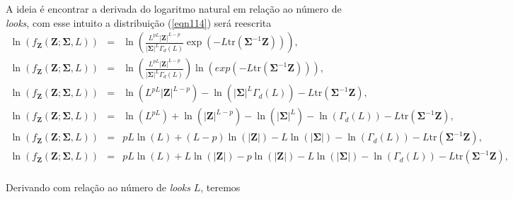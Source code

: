 A ideia é encontrar a derivada do logaritmo natural em relação ao número de {\it looks}, com esse intuito a distribuição (\ref{eqn114}) será reescrita
\begin{equation}\label{eqn115}
\begin{array}{ccc}
	\ln{\left(f_{\mathbf{Z}}(\mathbf{Z};\mathbf{\Sigma},L)\right)}&=&\ln{\left(\frac{L^{pL}|\mathbf{Z}|^{L-p}}{|\mathbf{\Sigma}|^{L}\Gamma_d(L)} \exp(-L\mathrm{tr}{(\mathbf{\Sigma}^{-1}\mathbf{Z})})\right)}, \\
	\ln{\left(f_{\mathbf{Z}}(\mathbf{Z};\mathbf{\Sigma},L)\right)}&=&\ln{\left(\frac{L^{pL}|\mathbf{Z}|^{L-p}}{|\mathbf{\Sigma}|^{L}\Gamma_d(L)}\right)}\ln{\left( exp(-L\mathrm{tr}{(\mathbf{\Sigma}^{-1}\mathbf{Z})})\right)}, \\
	\ln{\left(f_{\mathbf{Z}}(\mathbf{Z};\mathbf{\Sigma},L)\right)}&=&\ln{\left(L^{pL}|\mathbf{Z}|^{L-p}\right)} - \ln{\left(|\mathbf{\Sigma}|^{L}\Gamma_d(L)\right)}-L\mathrm{tr}{(\mathbf{\Sigma}^{-1}\mathbf{Z})}, \\
	\ln{\left(f_{\mathbf{Z}}(\mathbf{Z};\mathbf{\Sigma},L)\right)}&=&\ln{\left(L^{pL}\right)}+\ln{\left( |\mathbf{Z}|^{L-p}\right)} - \ln{\left(|\mathbf{\Sigma}|^{L}\right)}-\ln{\left(\Gamma_d(L)\right)}-L\mathrm{tr}{(\mathbf{\Sigma}^{-1}\mathbf{Z})}, \\
	\ln{\left(f_{\mathbf{Z}}(\mathbf{Z};\mathbf{\Sigma},L)\right)}&=&pL\ln{\left(L\right)}+(L-p)\ln{\left( |\mathbf{Z}|\right)} - L\ln{\left(|\mathbf {\Sigma}|\right)}-\ln{\left(\Gamma_d(L)\right)}-L\mathrm{tr}{(\mathbf{\Sigma}^{-1}\mathbf {Z})}, \\
	\ln{\left(f_{\mathbf{Z}}(\mathbf{Z};\mathbf{\Sigma},L)\right)}&=&pL\ln{\left(L\right)}+L\ln{\left( |\mathbf{Z}|\right)}-p\ln{\left( |\mathbf{Z}|\right)}- L\ln{\left(|\mathbf{\Sigma}|\right)}-\ln{\left(\Gamma_d(L)\right)}-L\mathrm{tr}{(\mathbf{\Sigma}^{-1}\mathbf {Z})}, \\
\end{array}
\end{equation}


Derivando com relação ao número de {\it looks} $L$, teremos

